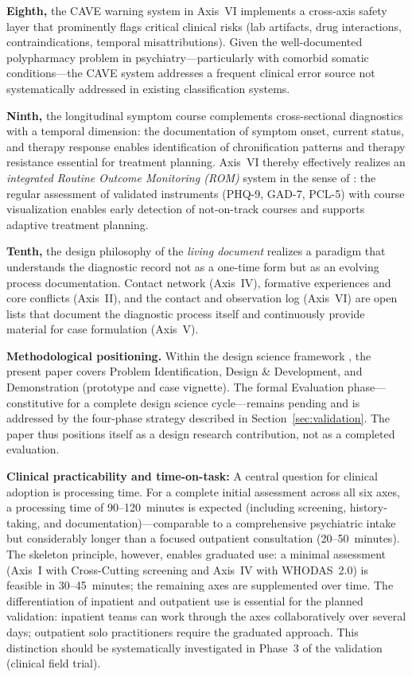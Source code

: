 \documentclass[11pt,a4paper]{article}
\begin{document}
\textbf{Eighth,} the CAVE warning system in Axis~VI implements a cross-axis safety layer that prominently flags critical clinical risks (lab artifacts, drug interactions, contraindications, temporal misattributions). Given the well-documented polypharmacy problem in psychiatry---particularly with comorbid somatic conditions---the CAVE system addresses a frequent clinical error source not systematically addressed in existing classification systems.

\textbf{Ninth,} the longitudinal symptom course complements cross-sectional diagnostics with a temporal dimension: the documentation of symptom onset, current status, and therapy response enables identification of chronification patterns and therapy resistance essential for treatment planning. Axis~VI thereby effectively realizes an \textit{integrated Routine Outcome Monitoring (ROM)} system in the sense of \citet{Barkham2023}: the regular assessment of validated instruments (PHQ-9, GAD-7, PCL-5) with course visualization enables early detection of not-on-track courses and supports adaptive treatment planning.

\textbf{Tenth,} the design philosophy of the \textit{living document} realizes a paradigm that understands the diagnostic record not as a one-time form but as an evolving process documentation. Contact network (Axis~IV), formative experiences and core conflicts (Axis~II), and the contact and observation log (Axis~VI) are open lists that document the diagnostic process itself and continuously provide material for case formulation (Axis~V).

\vspace{0.5em}
\textbf{Methodological positioning.} Within the design science framework \citep{Hevner2004, Peffers2007}, the present paper covers Problem Identification, Design \& Development, and Demonstration (prototype and case vignette). The formal Evaluation phase---constitutive for a complete design science cycle---remains pending and is addressed by the four-phase strategy described in Section~\ref{sec:validation}. The paper thus positions itself as a design research contribution, not as a completed evaluation.

\textbf{Clinical practicability and time-on-task:} A central question for clinical adoption is processing time. For a complete initial assessment across all six axes, a processing time of 90--120~minutes is expected (including screening, history-taking, and documentation)---comparable to a comprehensive psychiatric intake but considerably longer than a focused outpatient consultation (20--50~minutes). The skeleton principle, however, enables graduated use: a minimal assessment (Axis~I with Cross-Cutting screening and Axis~IV with WHODAS~2.0) is feasible in 30--45~minutes; the remaining axes are supplemented over time. The differentiation of inpatient and outpatient use is essential for the planned validation: inpatient teams can work through the axes collaboratively over several days; outpatient solo practitioners require the graduated approach. This distinction should be systematically investigated in Phase~3 of the validation (clinical field trial).
\end{document}
